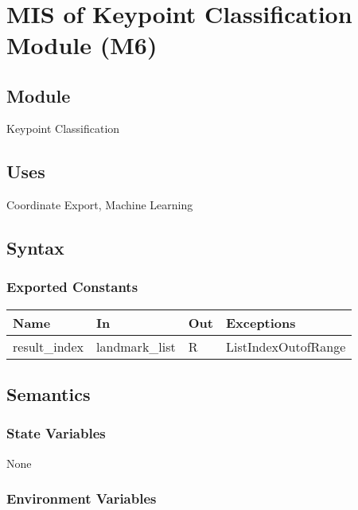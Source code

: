 \documentclass[12pt, titlepage]{article}
\begin{document}
~\newpage

\section{MIS of Keypoint Classification Module (M6)} \label{M6}

\subsection{Module}

Keypoint Classification\\

\subsection{Uses}

Coordinate Export, Machine Learning\\

\subsection{Syntax}

\subsubsection{Exported Constants}

\begin{center}
\begin{tabular}{p{5cm} p{3cm} p{3cm} p{4cm}}
\hline
\textbf{Name} & \textbf{In} & \textbf{Out} & \textbf{Exceptions} \\
\hline
result\_index & landmark_list & R & ListIndexOutofRange \\
\hline
\end{tabular}
\end{center}

\subsection{Semantics}

\subsubsection{State Variables}

None\\

\subsubsection{Environment Variables}
\end{document}

